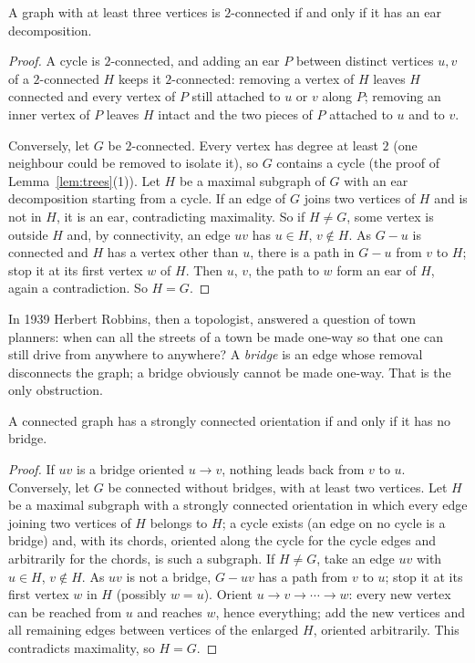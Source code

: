 \begin{theorem}[Whitney, 1932]\label{thm:ears}
A graph with at least three vertices is $2$-connected if and only if it has an ear decomposition.
\end{theorem}
\begin{proof}
A cycle is $2$-connected, and adding an ear $P$ between distinct vertices $u,v$ of a $2$-connected $H$ keeps it $2$-connected: removing a vertex of
$H$ leaves $H$ connected and every vertex of $P$ still attached to $u$ or $v$ along $P$; removing an inner vertex of $P$ leaves $H$ intact and
the two pieces of $P$ attached to $u$ and to $v$.

Conversely, let $G$ be $2$-connected. Every vertex has degree at least $2$ (one neighbour could be removed to isolate it), so $G$
contains a cycle (the proof of Lemma~\ref{lem:trees}(1)). Let $H$ be a maximal subgraph of $G$ with an ear decomposition starting from a
cycle. If an edge of $G$ joins two vertices of $H$ and is not in $H$, it is an ear, contradicting maximality. So if $H\ne G$, some vertex is
outside $H$ and, by connectivity, an edge $uv$ has $u\in H$, $v\notin H$. As $G-u$ is connected and $H$ has a vertex other than $u$, there is a path
in $G-u$ from $v$ to $H$; stop it at its first vertex $w$ of $H$. Then $u$, $v$, the path to $w$ form an ear of $H$, again a contradiction.
So $H=G$.
\end{proof}

In 1939 Herbert Robbins, then a topologist, answered a question of town planners: when can all the streets of a town be made
one-way so that one can still drive from anywhere to anywhere? A \emph{bridge} is an edge whose removal disconnects the graph; a bridge
obviously cannot be made one-way. That is the only obstruction.

\begin{theorem}[Robbins, 1939]\label{thm:robbins}
A connected graph has a strongly connected orientation if and only if it has no bridge.
\end{theorem}
\begin{proof}
If $uv$ is a bridge oriented $u\to v$, nothing leads back from $v$ to $u$. Conversely, let $G$ be connected without bridges, with at least two
vertices. Let $H$ be a maximal subgraph with a strongly connected orientation in which every edge joining two vertices of $H$ belongs to
$H$; a cycle exists (an edge on no cycle is a bridge) and, with its chords, oriented along the cycle for the cycle edges and
arbitrarily for the chords, is such a subgraph. If $H\ne G$, take an edge $uv$ with $u\in H$, $v\notin H$. As $uv$ is not a bridge, $G-uv$ has a path from
$v$ to $u$; stop it at its first vertex $w$ in $H$ (possibly $w=u$). Orient $u\to v\to\cdots\to w$: every new vertex can be reached from $u$ and reaches $w$,
hence everything; add the new vertices and all remaining edges between vertices of the enlarged $H$, oriented arbitrarily. This
contradicts maximality, so $H=G$.
\end{proof}

